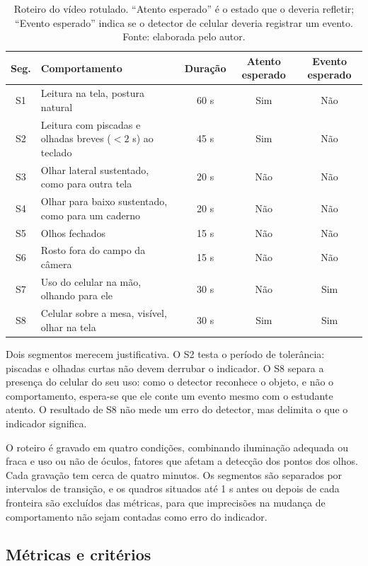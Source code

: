 \begin{table}[htbp]
\centering
\caption{Roteiro do vídeo rotulado. ``Atento esperado'' é o estado que o \fs deveria refletir; ``Evento esperado'' indica se o detector de celular deveria registrar um evento. Fonte: elaborada pelo autor.}
\label{tab:roteiro}
\small
\begin{tabularx}{\textwidth}{c >{\raggedright\arraybackslash}X c c c}
\toprule
Seg. & Comportamento & Duração & Atento esperado & Evento esperado \\
\midrule
S1 & Leitura na tela, postura natural & 60 s & Sim & Não \\
S2 & Leitura com piscadas e olhadas breves ($<2$ s) ao teclado & 45 s & Sim & Não \\
S3 & Olhar lateral sustentado, como para outra tela & 20 s & Não & Não \\
S4 & Olhar para baixo sustentado, como para um caderno & 20 s & Não & Não \\
S5 & Olhos fechados & 15 s & Não & Não \\
S6 & Rosto fora do campo da câmera & 15 s & Não & Não \\
S7 & Uso do celular na mão, olhando para ele & 30 s & Não & Sim \\
S8 & Celular sobre a mesa, visível, olhar na tela & 30 s & Sim & Sim \\
\bottomrule
\end{tabularx}
\end{table}

Dois segmentos merecem justificativa. O S2 testa o período de tolerância: piscadas e olhadas curtas não devem derrubar o indicador. O S8 separa a presença do celular do seu uso: como o detector reconhece o objeto, e não o comportamento, espera-se que ele conte um evento mesmo com o estudante atento. O resultado de S8 não mede um erro do detector, mas delimita o que o indicador significa.

O roteiro é gravado em quatro condições, combinando iluminação adequada ou fraca e uso ou não de óculos, fatores que afetam a detecção dos pontos dos olhos. Cada gravação tem cerca de quatro minutos. Os segmentos são separados por intervalos de transição, e os quadros situados até 1 s antes ou depois de cada fronteira são excluídos das métricas, para que imprecisões na mudança de comportamento não sejam contadas como erro do indicador.

\subsection{Métricas e critérios}

